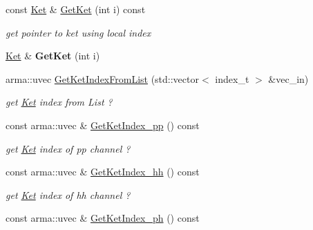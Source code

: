 \begin{DoxyCompactItemize}
\mbox{\label{classTwoBodyChannel_aa6cf4eca0b9d1e82c0caf4744fc95d9e}} 
const \hyperlink{classKet}{Ket} \& \hyperlink{classTwoBodyChannel_aa6cf4eca0b9d1e82c0caf4744fc95d9e}{Get\+Ket} (int i) const
\begin{DoxyCompactList}\small\item\em get pointer to ket using local index \end{DoxyCompactList}\item 
\mbox{\label{classTwoBodyChannel_ad4d43b775faff6cfb512d11dfed230c9}} 
\hyperlink{classKet}{Ket} \& {\bfseries Get\+Ket} (int i)
\item 
\mbox{\label{classTwoBodyChannel_a1e132833f7ca846b87f724dd0dfabfe2}} 
arma\+::uvec \hyperlink{classTwoBodyChannel_a1e132833f7ca846b87f724dd0dfabfe2}{Get\+Ket\+Index\+From\+List} (std\+::vector$<$ index\+\_\+t $>$ \&vec\+\_\+in)
\begin{DoxyCompactList}\small\item\em get \hyperlink{classKet}{Ket} index from List ? \end{DoxyCompactList}\item 
\mbox{\label{classTwoBodyChannel_ab62d6440a9106dc9c93e0a74ac69bb1a}} 
const arma\+::uvec \& \hyperlink{classTwoBodyChannel_ab62d6440a9106dc9c93e0a74ac69bb1a}{Get\+Ket\+Index\+\_\+pp} () const
\begin{DoxyCompactList}\small\item\em get \hyperlink{classKet}{Ket} index of pp channel ? \end{DoxyCompactList}\item 
\mbox{\label{classTwoBodyChannel_aadaffd935e935e7eeac860cce28e7db5}} 
const arma\+::uvec \& \hyperlink{classTwoBodyChannel_aadaffd935e935e7eeac860cce28e7db5}{Get\+Ket\+Index\+\_\+hh} () const
\begin{DoxyCompactList}\small\item\em get \hyperlink{classKet}{Ket} index of hh channel ? \end{DoxyCompactList}\item 
\mbox{\label{classTwoBodyChannel_a49c55ec79a3e58a8812196e43c5891a2}} 
const arma\+::uvec \& \hyperlink{classTwoBodyChannel_a49c55ec79a3e58a8812196e43c5891a2}{Get\+Ket\+Index\+\_\+ph} () const

\end{DoxyCompactItemize}
